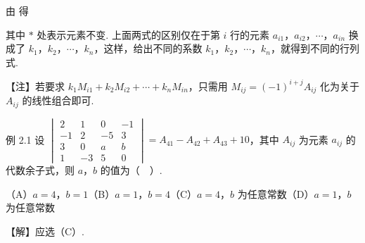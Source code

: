 



由
得

其中 $*$ 处表示元素不变. 上面两式的区别仅在于第 $i$ 行的元素 $a_{i1}$，$a_{i2}$，$\cdots$，$a_{in}$ 换成了 $k_1$，$k_2$，$\cdots$，$k_n$，这样，给出不同的系数 $k_1$，$k_2$，$\cdots$，$k_n$，就得到不同的行列式.

\begin{fnote}
【注】若要求 $k_1M_{i1}+k_2M_{i2}+\cdots+k_nM_{in}$，只需用 $M_{ij}=(-1)^{i+j}A_{ij}$ 化为关于 $A_{ij}$ 的线性组合即可.
\end{fnote}

\begin{fcard}{例 2.1}
设 $\begin{vmatrix}2&1&0&-1\\-1&2&-5&3\\3&0&a&b\\1&-3&5&0\end{vmatrix}=A_{41}-A_{42}+A_{43}+10$，其中 $A_{ij}$ 为元素 $a_{ij}$ 的代数余子式，则 $a$，$b$ 的值为（　）.

（A）$a=4$，$b=1$\qquad（B）$a=1$，$b=4$\qquad（C）$a=4$，$b$ 为任意常数\qquad（D）$a=1$，$b$ 为任意常数
\end{fcard}

【解】应选（C）.

